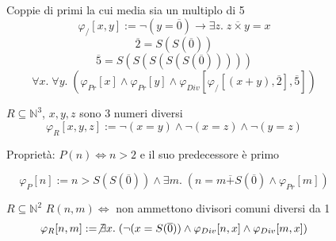 \documentclass{article}
\theoremstyle{break}
\theoremstyle{break}
\theoremstyle{break}
\theoremstyle{break}
\begin{document}
  \begin{figure}[H]
    \begin{exercise}
      Coppie di primi la cui media sia un multiplo di 5
      \[
        \varphi_{/}[x,y] := \neg(y = \overline{0}) \to \exists z.\; z \overline{\times } y = x 
      \] 
      \[
        \overline{2} = S(S(\overline{0}))
      \] 
      \[
        \overline{5} = S(S(S(S(S(\overline{0})))))
      \] 
      \[
        \forall x.\; \forall y.\; (\varphi_{Pr}[x] \wedge \varphi_{Pr}[y] \wedge \varphi_{Div}[\varphi_{/}[(x+y), \overline{2}], \overline{5}])
      \] 
    \end{exercise}
  \end{figure}

  \begin{figure}[H]
    \begin{exercise}
      \( R \subseteq \mathbb{N}^3 \), \( x,y,z \) sono 3 numeri diversi
      \[
        \varphi_{R}[x,y,z] :=  \neg (x = y) \wedge \neg (x = z) \wedge \neg(y = z)
      \] 
    \end{exercise}
  \end{figure}

  \begin{figure}[H]
    \begin{exercise}
      Proprietà:  \( P(n) \Leftrightarrow n>2 \) e il suo predecessore è primo

      \[
        \varphi_{P}[n] := n > S(S(\overline{0})) \wedge \exists m.\; (n = m \overline{+} S(\overline{0}) \wedge \varphi_{Pr}[m])
      \] 
    \end{exercise}
  \end{figure}

  \begin{figure}[H]
    \begin{exercise}
      \( R \subseteq \mathbb{N}^2 \)  \( R(n,m) \Leftrightarrow \) non ammettono divisori comuni diversi da 1
      \[
        \varphi_{R}[n,m] := \not\exists x.\; (\neg(x = S(\overline{0})) \wedge \varphi_{Div}[n,x] \wedge \varphi_{Div}[m,x])
      \] 
    \end{exercise}
  \end{figure}
\end{document}
